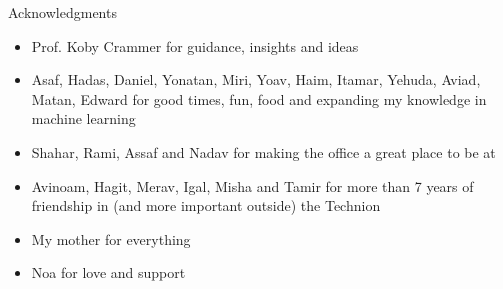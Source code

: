 \documentclass{beamer}
\begin{document}
\begin{frame}{Acknowledgments}
\begin{itemize}
\item Prof. Koby Crammer for guidance, insights and ideas 
\item Asaf, Hadas, Daniel, Yonatan, Miri, Yoav, Haim, Itamar, Yehuda, Aviad, Matan, Edward for good times, fun, food and expanding my knowledge in machine learning
\item Shahar, Rami, Assaf and Nadav for making the office a great place to be at
\item Avinoam, Hagit, Merav, Igal, Misha and Tamir for more than 7 years of friendship in (and more important outside) the Technion
\item My mother for everything 
\item Noa for love and support 
\end{itemize}

\end{frame}
\end{document}
